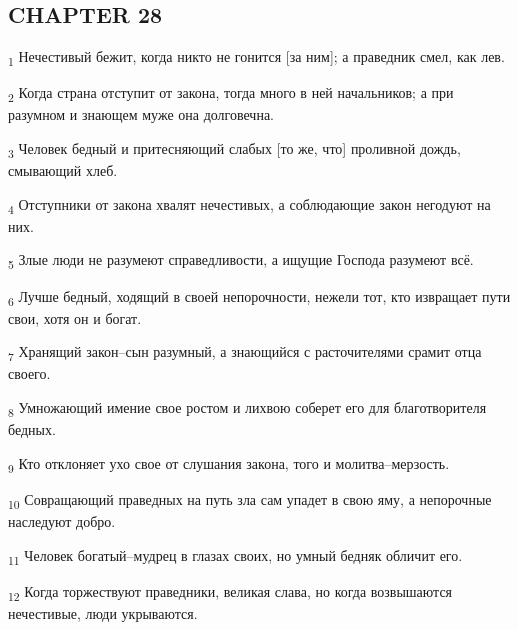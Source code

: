 \subsection{CHAPTER 28}
\begin{tcolorbox}
\textsubscript{1} Нечестивый бежит, когда никто не гонится [за ним]; а праведник смел, как лев.
\end{tcolorbox}
\begin{tcolorbox}
\textsubscript{2} Когда страна отступит от закона, тогда много в ней начальников; а при разумном и знающем муже она долговечна.
\end{tcolorbox}
\begin{tcolorbox}
\textsubscript{3} Человек бедный и притесняющий слабых [то же, что] проливной дождь, смывающий хлеб.
\end{tcolorbox}
\begin{tcolorbox}
\textsubscript{4} Отступники от закона хвалят нечестивых, а соблюдающие закон негодуют на них.
\end{tcolorbox}
\begin{tcolorbox}
\textsubscript{5} Злые люди не разумеют справедливости, а ищущие Господа разумеют всё.
\end{tcolorbox}
\begin{tcolorbox}
\textsubscript{6} Лучше бедный, ходящий в своей непорочности, нежели тот, кто извращает пути свои, хотя он и богат.
\end{tcolorbox}
\begin{tcolorbox}
\textsubscript{7} Хранящий закон--сын разумный, а знающийся с расточителями срамит отца своего.
\end{tcolorbox}
\begin{tcolorbox}
\textsubscript{8} Умножающий имение свое ростом и лихвою соберет его для благотворителя бедных.
\end{tcolorbox}
\begin{tcolorbox}
\textsubscript{9} Кто отклоняет ухо свое от слушания закона, того и молитва--мерзость.
\end{tcolorbox}
\begin{tcolorbox}
\textsubscript{10} Совращающий праведных на путь зла сам упадет в свою яму, а непорочные наследуют добро.
\end{tcolorbox}
\begin{tcolorbox}
\textsubscript{11} Человек богатый--мудрец в глазах своих, но умный бедняк обличит его.
\end{tcolorbox}
\begin{tcolorbox}
\textsubscript{12} Когда торжествуют праведники, великая слава, но когда возвышаются нечестивые, люди укрываются.
\end{tcolorbox}
